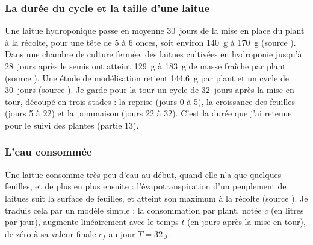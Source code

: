 \subsubsection*{La durée du cycle et la taille d'une laitue}

Une laitue hydroponique passe en moyenne \qty{30}{jours} de la mise en place du plant à la récolte, pour une tête de 5 à 6 onces, soit environ \qty{140}{g} à \qty{170}{g} (source ). Dans une chambre de culture fermée, des laitues cultivées en hydroponie jusqu'à \qty{28}{jours} après le semis ont atteint \qty{129}{g} à \qty{183}{g} de masse fraîche par plant (source ). Une étude de modélisation retient \qty{144,6}{g} par plant et un cycle de \qty{30}{jours} (source ). Je garde pour la tour un cycle de \qty{32}{jours} après la mise en tour, découpé en trois stades : la reprise (jours 0 à 5), la croissance des feuilles (jours 5 à 22) et la pommaison (jours 22 à 32). C'est la durée que j'ai retenue pour le suivi des plantes (partie 13).

\subsubsection*{L'eau consommée}

Une laitue consomme très peu d'eau au début, quand elle n'a que quelques feuilles, et de plus en plus ensuite : l'évapotranspiration d'un peuplement de laitues suit la surface de feuilles, et atteint son maximum à la récolte (source ). Je traduis cela par un modèle simple : la consommation par plant, notée $c$ (en litres par jour), augmente linéairement avec le temps $t$ (en jours après la mise en tour), de zéro à sa valeur finale $c_f$ au jour $T = \qty{32}{j}$.

